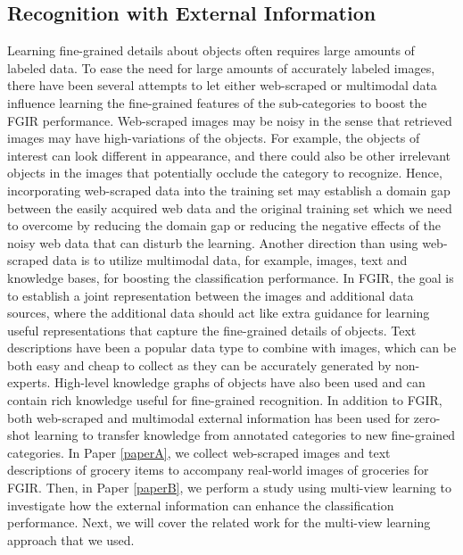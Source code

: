 \subsection{Recognition with External Information}
Learning fine-grained details about objects often requires large amounts of labeled data. To ease the need for large amounts of accurately labeled images, there have been several attempts to let either web-scraped or multimodal data influence learning the fine-grained features of the sub-categories to boost the FGIR performance. Web-scraped images may be noisy in the sense that retrieved images may have high-variations of the objects. For example, the objects of interest can look different in appearance, and there could also be other irrelevant objects in the images that potentially occlude the category to recognize. Hence, incorporating web-scraped data into the training set may establish a domain gap between the easily acquired web data and the original training set which we need to overcome by reducing the domain gap or reducing the negative effects of the noisy web data that can disturb the learning. Another direction than using web-scraped data is to utilize multimodal data, for example, images, text and knowledge bases, for boosting the classification performance. In FGIR, the goal is to establish a joint representation between the images and additional data sources, where the additional data should act like extra guidance for learning useful representations that capture the fine-grained details of objects. Text descriptions have been a popular data type to combine with images, which can be both easy and cheap to collect as they can be accurately generated by non-experts. High-level knowledge graphs of objects have also been used and can contain rich knowledge useful for fine-grained recognition. In addition to FGIR, both web-scraped and multimodal external information has been used for zero-shot learning to transfer knowledge from annotated categories to new fine-grained categories. In Paper \ref{paperA}, we collect web-scraped images and text descriptions of grocery items to accompany real-world images of groceries for FGIR. Then, in Paper \ref{paperB}, we perform a study using multi-view learning to investigate how the external information can enhance the classification performance. Next, we will cover the related work for the multi-view learning approach that we used. 


